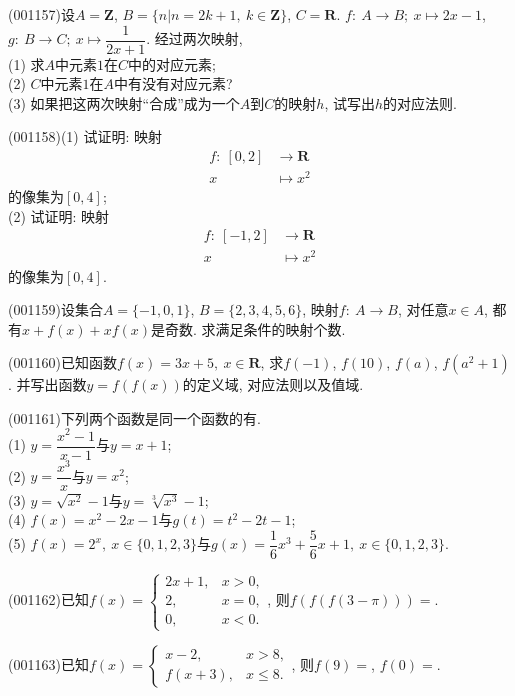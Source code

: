 \item (001157)设$A=\mathbf{Z}$, $B=\{n|n=2k+1,\ k\in \mathbf{Z}\}$, $C=\mathbf{R}$. $f:\ A\rightarrow B;\ x\mapsto 2x-1$, $g:\ B\rightarrow C;\ x\mapsto \dfrac{1}{2x+1}$. 经过两次映射,\\ 
(1) 求$A$中元素$1$在$C$中的对应元素;\\ 
(2) $C$中元素$1$在$A$中有没有对应元素?\\ 
(3) 如果把这两次映射``合成''成为一个$A$到$C$的映射$h$, 试写出$h$的对应法则.
\item (001158)(1) 试证明: 映射
\begin{align*}
f:\ [0,2]&\rightarrow \mathbf{R}\\
x&\mapsto x^2
\end{align*}
的像集为$[0,4]$;\\ 
(2) 试证明: 映射
\begin{align*}
f:\ [-1,2]&\rightarrow \mathbf{R}\\
x& \mapsto x^2
\end{align*}
的像集为$[0,4]$.
\item (001159)设集合$A=\{-1, 0, 1\}$, $B=\{2,3,4,5,6\}$, 映射$f:\ A\rightarrow B$, 对任意$x\in A$, 都有$x+f(x)+xf(x)$是奇数. 求满足条件的映射个数.
\item (001160)已知函数$f(x)=3x+5, \ x\in \mathbf{R}$, 求$f(-1)$, $f(10)$, $f(a)$, $f(a^2+1)$. 并写出函数$y=f(f(x))$的定义域, 对应法则以及值域.
\item (001161)下列两个函数是同一个函数的有.\\ 
(1) $y=\dfrac{x^2-1}{x-1}$与$y=x+1$;\\ 
(2) $y=\dfrac{x^3}{x}$与$y=x^2$;\\ 
(3) $y=\sqrt{x^2}-1$与$y=\sqrt[3]{x^3}-1$;\\ 
(4) $f(x)=x^2-2x-1$与$g(t)=t^2-2t-1$;\\ 
(5) $f(x)=2^x, \ x \in \{0,1,2,3\}$与$g(x)=\dfrac16x^3+\dfrac56x+1, \ x \in \{0,1,2,3\}$.
\item (001162)已知$f(x)=\left\{\begin{array}{cc}2x+1, & x>0,\\2, & x=0,\\0, & x<0.\end{array}\right.$, 则$f(f(f(3-\pi)))=$.
\item (001163)已知$f(x)=\left\{\begin{array}{cc}x-2, & x>8,\\f(x+3), & x\le 8.\end{array}\right.$, 则$f(9)=$, $f(0)=$.

